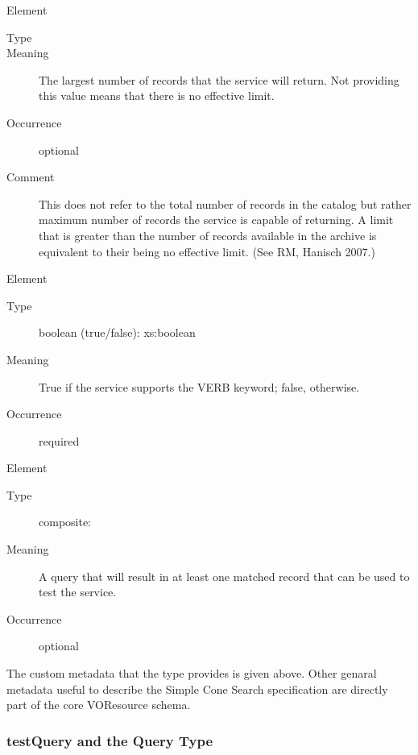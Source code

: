 \documentclass[11pt,a4paper]{ivoa}
\begin{document}
\begin{generated}
\begin{bigdescription}
	\item[Element \xmlel{maxRecords}]
	\begin{description}
		\item[Type] 
		\item[Meaning] The largest number of records that the service 
will return.  Not providing this value means that there is no effective limit.
	\item[Occurrence] optional 
	\item[Comment] This does not refer to the
total number of records in the catalog but rather maximum number of
records the service is capable of returning.  A limit that is greater
than the number of records available in the archive is equivalent to
their being no effective limit.  (See RM, Hanisch 2007.)
	\end{description} 

	\item[Element \xmlel{verbosity}]
	\begin{description}
		\item[Type] boolean (true/false): xs:boolean
		\item[Meaning] True if the service supports the VERB keyword; false, otherwise.
		\item[Occurrence] required
	\end{description}

	\item[Element \xmlel{testQuery}]
	\begin{description}
		\item[Type] composite: 
		\item[Meaning] A query that will result in at least one matched 
record that can be used to test the service.  
		\item[Occurrence] optional
	\end{description}

\end{bigdescription}
\endgroup

\endgroup 
\end{generated}


The custom metadata that the  type provides is
given above. Other genaral metadata useful to describe the Simple Cone
Search specification are directly part of the core VOResource schema.

\subsubsection{testQuery and the Query Type}
\end{document}
